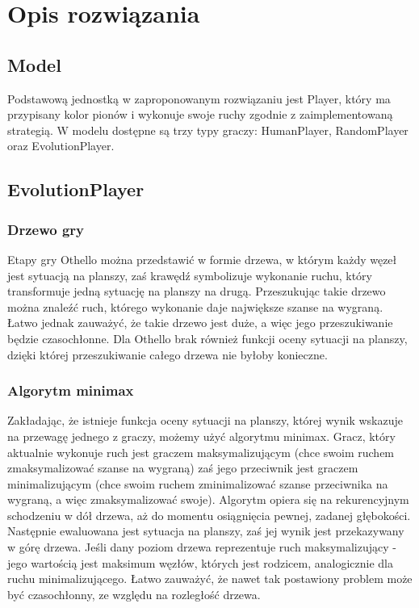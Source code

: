 \section{Opis rozwiązania} 

\subsection{Model}

Podstawową jednostką w zaproponowanym rozwiązaniu jest Player, który ma przypisany kolor pionów i wykonuje swoje ruchy zgodnie z zaimplementowaną strategią. W modelu dostępne są trzy typy graczy: HumanPlayer, RandomPlayer oraz EvolutionPlayer.

\subsection{EvolutionPlayer}

\subsubsection{Drzewo gry}
Etapy gry Othello można przedstawić w formie drzewa, w którym każdy węzeł jest sytuacją na planszy, zaś krawędź symbolizuje wykonanie ruchu, który transformuje jedną sytuację na planszy na drugą. Przeszukując takie drzewo można znaleźć ruch, którego wykonanie daje największe szanse na wygraną. Łatwo jednak zauważyć, że takie drzewo jest duże, a więc jego przeszukiwanie będzie czasochłonne. Dla Othello brak również funkcji oceny sytuacji na planszy, dzięki której przeszukiwanie całego drzewa nie byłoby konieczne.

\subsubsection{Algorytm minimax}
Zakładając, że istnieje funkcja oceny sytuacji na planszy, której wynik wskazuje na przewagę jednego z graczy, możemy użyć algorytmu minimax. Gracz, który aktualnie wykonuje ruch jest graczem maksymalizującym (chce swoim ruchem zmaksymalizować szanse na wygraną) zaś jego przeciwnik jest graczem minimalizującym (chce swoim ruchem zminimalizować szanse przeciwnika na wygraną, a więc zmaksymalizować swoje). Algorytm opiera się na rekurencyjnym schodzeniu w dół drzewa, aż do momentu osiągnięcia pewnej, zadanej głębokości. Następnie ewaluowana jest sytuacja na planszy, zaś jej wynik jest przekazywany w górę drzewa. Jeśli dany poziom drzewa reprezentuje ruch maksymalizujący - jego wartością jest maksimum węzłów, których jest rodzicem, analogicznie dla ruchu minimalizującego. Łatwo zauważyć, że nawet tak postawiony problem może być czasochłonny, ze względu na rozległość drzewa.

